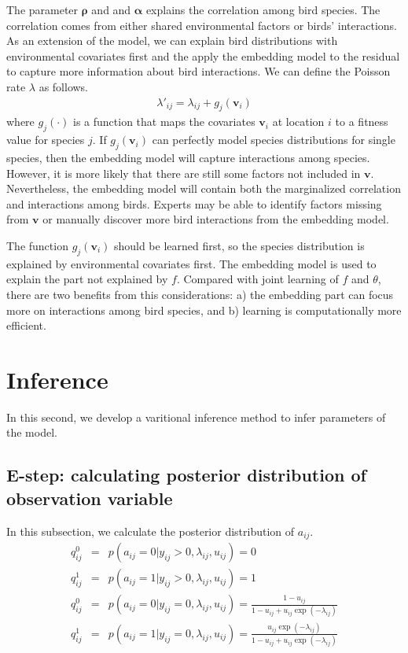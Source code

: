 \documentclass{article}
\newcommand{\wt}{\boldsymbol{\rho}}
\newcommand{\emb}{\boldsymbol{\alpha}}
\begin{document}
The parameter $\wt$ and and $\emb$ explains the correlation among bird species. The correlation comes from either shared environmental factors or birds' interactions. As an extension of the model, we can explain bird distributions with environmental covariates first and the apply the embedding model to the residual to capture more information about bird interactions. We can define the Poisson rate $\lambda$ as follows. 
\begin{eqnarray}
\lambda'_{ij} =  \lambda_{ij} + g_j (\mathbf{v}_i)
\end{eqnarray}
where $g_j(\cdot)$ is a function that maps the covariates $\mathbf{v}_i$ at location $i$ to a fitness value for species $j$. If $g_j (\mathbf{v}_i)$ can perfectly model species distributions for single species, then the embedding model will capture interactions among species. However, it is more likely that there are still some factors not included in $\mathbf{v}$. Nevertheless, the embedding model will contain both the marginalized correlation and interactions among birds. Experts may be able to identify factors missing from $\mathbf{v}$ or manually discover more bird interactions from the embedding model.  

The function $g_j (\mathbf{v}_i)$ should be learned first, so the species distribution is explained by environmental covariates first. The embedding model is used to explain the part not explained by $f$. Compared with joint learning of $f$ and $\theta$, there are two benefits from this considerations: a) the embedding part can focus more on interactions among bird species, and b) learning is computationally more efficient. 

\section{Inference}

In this second, we develop a varitional inference method to infer parameters of the model. 

\subsection{ E-step: calculating posterior distribution of observation variable}

In this subsection, we calculate the posterior distribution of $a_{ij}$.
\begin{eqnarray}
q_{ij}^{0} &=& p(a_{ij} = 0 | y_{ij} > 0, \lambda_{ij}, u_{ij}) =  0 \\
q_{ij}^{1} &=& p(a_{ij} = 1 | y_{ij} > 0, \lambda_{ij}, u_{ij}) =  1 \\[10pt]
q_{ij}^{0} &=& p(a_{ij} = 0 | y_{ij} = 0, \lambda_{ij}, u_{ij}) =  \frac{1 - u_{ij}}{1 - u_{ij} + u_{ij}\exp(-\lambda_{ij})} \\
q_{ij}^{1} &=& p(a_{ij} = 1 | y_{ij} = 0, \lambda_{ij}, u_{ij}) =  \frac{u_{ij}\exp(-\lambda_{ij})}{1 - u_{ij} + u_{ij}\exp(-\lambda_{ij})}
\end{eqnarray}
\end{document}
